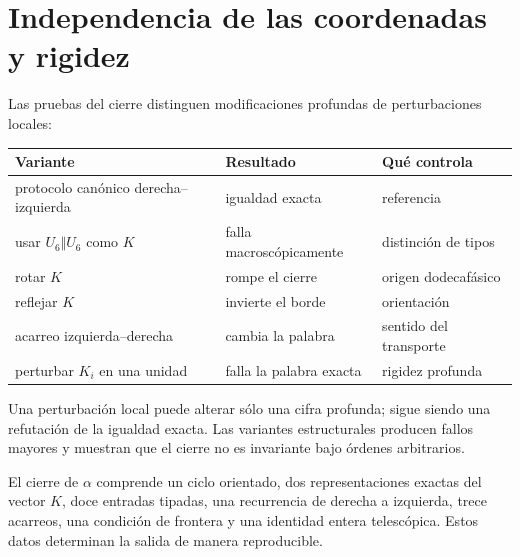 \section{Independencia de las coordenadas y rigidez}

Las pruebas del cierre distinguen modificaciones profundas de perturbaciones
locales:
\begin{center}
\small
\begin{tabularx}{\textwidth}{@{}lYY@{}}
\toprule
Variante & Resultado & Qué controla \\
\midrule
protocolo canónico derecha--izquierda & igualdad exacta & referencia \\
usar \(U_6\Vert U_6\) como \(K\) & falla macroscópicamente & distinción de tipos \\
rotar \(K\) & rompe el cierre & origen dodecafásico \\
reflejar \(K\) & invierte el borde & orientación \\
acarreo izquierda--derecha & cambia la palabra & sentido del transporte \\
perturbar \(K_i\) en una unidad & falla la palabra exacta & rigidez profunda \\
\bottomrule
\end{tabularx}
\end{center}
Una perturbación local puede alterar sólo una cifra profunda; sigue siendo una
refutación de la igualdad exacta. Las variantes estructurales producen fallos
mayores y muestran que el cierre no es invariante bajo órdenes arbitrarios.

\begin{remark}
El cierre de \(\alpha\) comprende un ciclo orientado, dos representaciones
exactas del vector \(K\), doce entradas tipadas, una recurrencia de derecha a
izquierda, trece acarreos, una condición de frontera y una identidad entera
telescópica. Estos datos determinan la salida de manera reproducible.
\end{remark}
